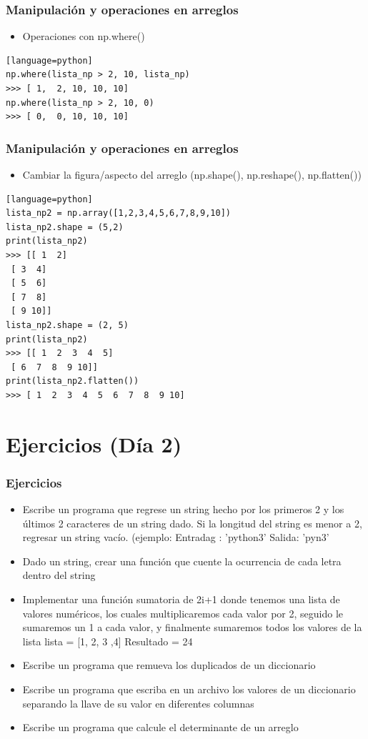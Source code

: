 \documentclass[hyperref={pdfpagelabels=false},xcolor=pst,pdf,fragile]{beamer}
\begin{document}
\begin{frame} [fragile]
    \frametitle{Manipulación y operaciones en arreglos}
    \begin{itemize}
    \item Operaciones con np.where()
    \end{itemize}
    \begin{lstlisting}[basicstyle=\tiny][language=python]
np.where(lista_np > 2, 10, lista_np)
>>> [ 1,  2, 10, 10, 10]
np.where(lista_np > 2, 10, 0)
>>> [ 0,  0, 10, 10, 10]
    \end{lstlisting}
\end{frame}

\begin{frame} [fragile]
    \frametitle{Manipulación y operaciones en arreglos}
    \begin{itemize}
    \item Cambiar la figura/aspecto del arreglo (np.shape(), np.reshape(), np.flatten())
    \end{itemize}
    \begin{lstlisting}[basicstyle=\tiny][language=python]
lista_np2 = np.array([1,2,3,4,5,6,7,8,9,10])
lista_np2.shape = (5,2)
print(lista_np2)
>>> [[ 1  2]
 [ 3  4]
 [ 5  6]
 [ 7  8]
 [ 9 10]]
lista_np2.shape = (2, 5)
print(lista_np2)
>>> [[ 1  2  3  4  5]
 [ 6  7  8  9 10]]
print(lista_np2.flatten())
>>> [ 1  2  3  4  5  6  7  8  9 10]
    \end{lstlisting}
\end{frame}


\section{Ejercicios (Día 2)}
\begin{frame}
    \frametitle{Ejercicios}
    \pause
    \begin{itemize}
    \item Escribe un programa que regrese un string hecho por los primeros 2 y los últimos 2 caracteres de un string dado. Si la longitud del string es menor a 2, regresar un string vacío. (ejemplo: Entradag : 'python3'
    Salida: 'pyn3'
    \item Dado un string, crear una función que cuente la ocurrencia de cada letra dentro del string
    \item Implementar una función sumatoria de 2i+1 donde tenemos una lista de valores numéricos, los cuales multiplicaremos cada valor por 2, seguido le sumaremos un 1 a cada valor, y finalmente sumaremos todos los valores de la lista
	lista = [1, 2, 3 ,4]
	Resultado = 24
	\item Escribe un programa que remueva los duplicados de un diccionario
	\item Escribe un programa que escriba en un archivo los valores de un diccionario separando la llave de su valor en diferentes columnas
	\item Escribe un programa que calcule el determinante de un arreglo
    \end{itemize}
\end{frame}
\end{document}
